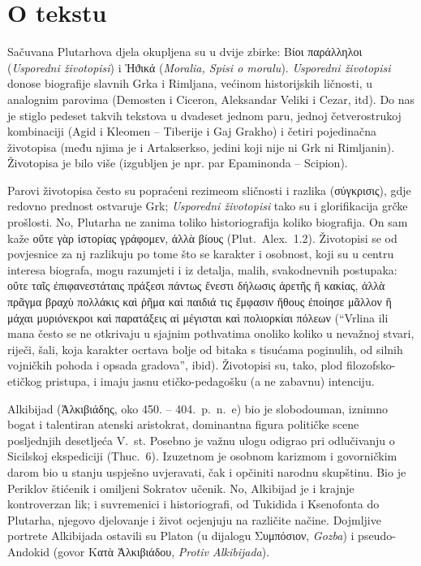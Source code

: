 


\section*{O tekstu}

Sačuvana Plutarhova djela okupljena su u dvije zbirke: Βίοι παράλληλοι (\textit{Usporedni životopisi}) i Ἠϑικά (\textit{Moralia, Spisi o moralu}). \textit{Usporedni životopisi} donose biografije slavnih Grka i Rimljana, većinom historijskih ličnosti, u analognim parovima (Demosten i Ciceron, Aleksandar Veliki i Cezar, itd). Do nas je stiglo pedeset takvih tekstova u dvadeset jednom paru, jednoj četverostrukoj kombinaciji (Agid i Kleomen – Tiberije i Gaj Grakho) i četiri pojedinačna životopisa (među njima je i Artakserkso, jedini koji nije ni Grk ni Rimljanin). Životopisa je bilo više (izgubljen je npr. par Epaminonda – Scipion).

Parovi životopisa često su popraćeni rezimeom sličnosti i razlika \textgreek[variant=ancient]{(σύγκρισις),} gdje redovno prednost ostvaruje Grk; \textit{Usporedni životopisi} tako su i glorifikacija grčke prošlosti. No, Plutarha ne zanima toliko historiografija koliko biografija. On sam kaže \textgreek[variant=ancient]{οὔτε γὰρ ἱστορίας γράφομεν, ἀλλὰ βίους} (Plut.\ Alex.~1.2). Životopisi se od povjesnice za nj razlikuju po tome što se karakter i osobnost, koji su u centru interesa biografa, mogu razumjeti i iz detalja, malih, svakodnevnih postupaka: \textgreek[variant=ancient]{οὔτε ταῖς ἐπιφανεστάταις πράξεσι πάντως ἔνεστι δήλωσις ἀρετῆς ἢ κακίας, ἀλλὰ πρᾶγμα βραχὺ πολλάκις καὶ ῥῆμα καὶ παιδιά τις ἔμφασιν ἤθους ἐποίησε μᾶλλον ἢ μάχαι μυριόνεκροι καὶ παρατάξεις αἱ μέγισται καὶ πολιορκίαι πόλεων} (``Vrlina ili mana često se ne otkrivaju u sjajnim pothvatima onoliko koliko u nevažnoj stvari, riječi, šali, koja karakter ocrtava bolje od bitaka s tisućama poginulih, od silnih vojničkih pohoda i opsada gradova'', ibid). Životopisi su, tako, plod filozofsko-etičkog pristupa, i imaju jasnu etičko-pedagošku (a ne zabavnu) intenciju. 

Alkibijad (Ἀλκιβιάδης, oko 450. – 404.\ p.~n.~e) bio je slobodouman, iznimno bogat i talentiran atenski aristokrat, dominantna figura političke scene posljednjih desetljeća V.\ st. Posebno je važnu ulogu odigrao pri odlučivanju o Sicilskoj ekspediciji (Thuc.~6). Izuzetnom je osobnom karizmom i govorničkim darom bio u stanju uspješno uvjeravati, čak i opčiniti narodnu skupštinu. Bio je Periklov štićenik i omiljeni Sokratov učenik. No, Alkibijad je i krajnje kontroverzan lik; i suvremenici i historiografi, od Tukidida i Ksenofonta do Plutarha, njegovo djelovanje i život ocjenjuju na različite načine. Dojmljive portrete Alkibijada ostavili su Platon (u dijalogu \textgreek[variant=ancient]{Συμπόσιον,} \textit{Gozba}) i pseudo-Andokid (govor \textgreek[variant=ancient]{Κατὰ Ἀλκιβιάδου,} \textit{Protiv Alkibijada}).

